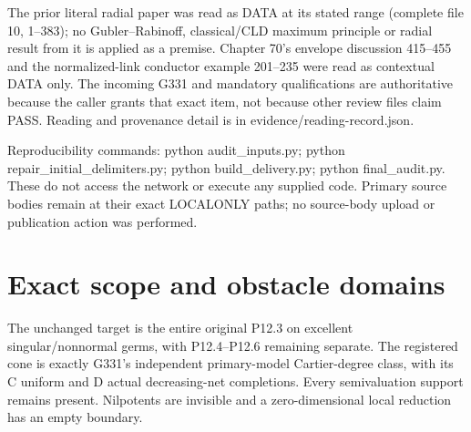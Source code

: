 \documentclass[11pt]{article}
\begin{document}
The prior literal radial paper was read as DATA at its stated range (complete file 10, 1--383); no Gubler--Rabinoff, classical/CLD maximum principle or radial result from it is applied as a premise. Chapter 70's envelope discussion 415--455 and the normalized-link conductor example 201--235 were read as contextual DATA only. The incoming G331 and mandatory qualifications are authoritative because the caller grants that exact item, not because other review files claim PASS. Reading and provenance detail is in evidence/reading-record.json.

Reproducibility commands: python audit\_inputs.py; python repair\_initial\_delimiters.py; python build\_delivery.py; python final\_audit.py. These do not access the network or execute any supplied code. Primary source bodies remain at their exact LOCALONLY paths; no source-body upload or publication action was performed.

\section{Exact scope and obstacle domains}

The unchanged target is the entire original P12.3 on excellent singular/nonnormal germs, with P12.4--P12.6 remaining separate. The registered cone is exactly G331's independent primary-model Cartier-degree class, with its C uniform and D actual decreasing-net completions. Every semivaluation support remains present. Nilpotents are invisible and a zero-dimensional local reduction has an empty boundary.
\end{document}

